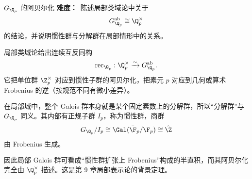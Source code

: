 \begin{problem}{$G_{\Q_p}$ 的阿贝尔化}
\textbf{难度：}\hard\ 陈述局部类域论中关于
\[
G_{\Q_p}^{\mathrm{ab}}\cong \Q_p^\times
\]
的结论，并说明惯性群与分解群在局部情形中的关系。
\end{problem}
\begin{solution}
局部类域论给出连续互反同构
\[
\operatorname{rec}_{\Q_p}:\Q_p^\times\xrightarrow{\sim}G_{\Q_p}^{\mathrm{ab}}.
\]
它把单位群 $\Z_p^\times$ 对应到惯性子群的阿贝尔化，把素元 $p$ 对应到几何或算术 Frobenius 的逆（按规范不同有微小差异）。

在局部域中，整个 Galois 群本身就是某个固定素数上的分解群，所以“分解群”与 $G_{\Q_p}$ 同义。其内部有正规子群 $I_p$，称为惯性群，商群
\[
G_{\Q_p}/I_p\cong \Gal(\bar\F_p/\F_p)\cong \hat\Z
\]
由 Frobenius 生成。

因此局部 Galois 群可看成“惯性群扩张上 Frobenius”构成的半直积，而其阿贝尔化完全由 $\Q_p^\times$ 描述。这是第 9 章局部表示论的背景定理。
\end{solution}
